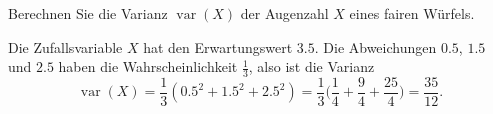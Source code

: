 Berechnen Sie die Varianz $\operatorname{var}(X)$
der Augenzahl $X$ eines fairen Würfels.

\begin{loesung}
Die Zufallsvariable $X$ hat den Erwartungswert $3.5$. Die Abweichungen
$0.5$, $1.5$ und $2.5$ haben die Wahrscheinlichkeit $\frac13$, also ist
die Varianz
\[
\operatorname{var}(X)=\frac13(0.5^2+1.5^2+2.5^2)=\frac13\biggl(
\frac14+\frac94+\frac{25}{4}
\biggr)
=\frac{35}{12}.
\]
\end{loesung}

